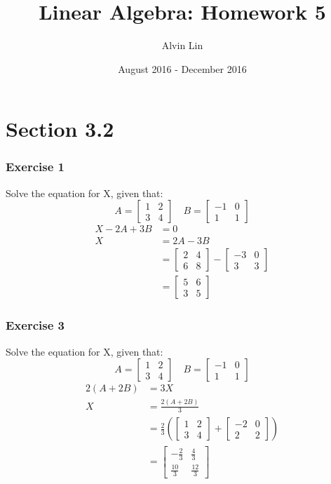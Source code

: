 \documentclass[letterpaper, 12pt]{math}
\title{Linear Algebra: Homework 5}
\author{Alvin Lin}
\date{August 2016 - December 2016}
\begin{document}
\maketitle

\section*{Section 3.2}

\subsubsection*{Exercise 1}
Solve the equation for X, given that:
\[ A = \begin{bmatrix}1 & 2 \\ 3 & 4\end{bmatrix} \quad
  B = \begin{bmatrix}-1 & 0 \\ 1 & 1\end{bmatrix} \]
\begin{align*}
  X-2A+3B &= 0 \\
  X &= 2A-3B \\
  &= \begin{bmatrix}2 & 4 \\ 6 & 8\end{bmatrix}-
    \begin{bmatrix}-3 & 0 \\ 3 & 3\end{bmatrix} \\
  &= \begin{bmatrix}5 & 6 \\ 3 & 5\end{bmatrix}
\end{align*}

\subsubsection*{Exercise 3}
Solve the equation for X, given that:
\[ A = \begin{bmatrix}1 & 2 \\ 3 & 4\end{bmatrix} \quad
  B = \begin{bmatrix}-1 & 0 \\ 1 & 1\end{bmatrix} \]
\begin{align*}
  2(A+2B) &= 3X \\
  X &= \frac{2(A+2B)}{3} \\
  &= \frac{2}{3}\left(\begin{bmatrix}
    1 & 2 \\
    3 & 4
  \end{bmatrix}+\begin{bmatrix}
    -2 & 0 \\
    2 & 2
  \end{bmatrix}\right) \\
  &= \begin{bmatrix}
    -\frac{2}{3} & \frac{4}{3} \\[0.5em]
    \frac{10}{3} & \frac{12}{3}
  \end{bmatrix}
\end{align*}
\end{document}
